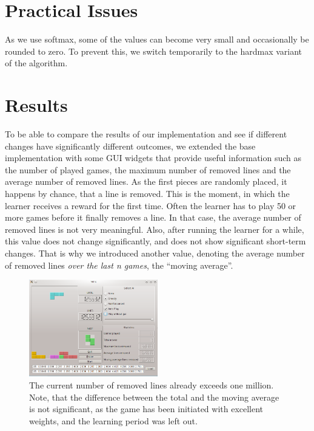 \documentclass{ml}
\begin{document}
\section{Practical Issues}

As we use softmax, some of the values can become very small and occasionally be rounded to zero. 
To prevent this, we switch temporarily to the hardmax variant of the algorithm.


\section{Results}
\label{results}

To be able to compare the results of our implementation and see if different changes have significantly different outcomes, we extended the base implementation with some GUI widgets that provide useful information such as the number of played games, the maximum number of removed lines and the average number of removed lines. As the first pieces are randomly placed, it happens by chance, that a line is removed. This is the moment, in which the learner receives a reward for the first time. Often the learner has to play 50 or more games  before it finally removes a line. In that case, the average number of removed lines is not very meaningful. Also, after running the learner for a while, this value does not change significantly, and does not show significant short-term changes. That is why we introduced another value, denoting the average number of removed lines \textit{over the last n games}, the ``moving average''.

\begin{figure}
  \vspace{-5pt}
  \begin{center}
    \includegraphics[width=0.5\textwidth]{img/three.png}
  \end{center}
  \vspace{-15pt}
  \caption{\small{The current number of removed lines already exceeds one million. Note, that the difference between the total and the moving average is not significant, as the game has been initiated with excellent weights, and the learning period was left out.}}
  \label{three}
  \vspace{-5pt}
\end{figure}
\end{document}
